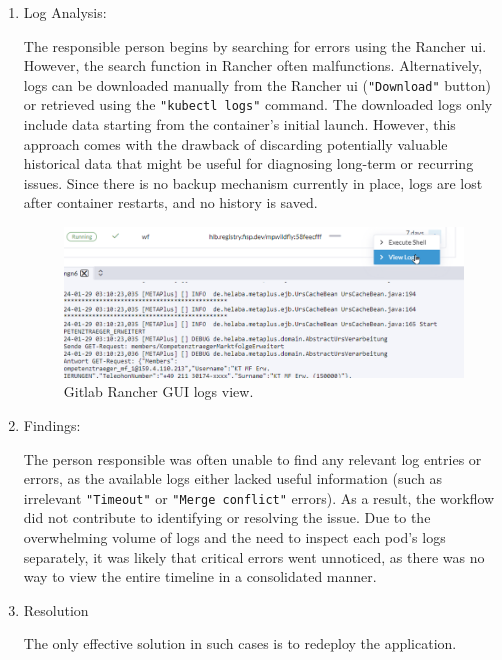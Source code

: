 \documentclass[../main.tex]{subfiles}
\begin{document}
\begin{enumerate}
    \item Log Analysis: 
    
    The responsible person begins by searching for errors using the Rancher \gls{ui}. However, the search function in Rancher often malfunctions. Alternatively, logs can be downloaded manually from the Rancher \gls{ui} (\texttt{"Download"} button) or retrieved using the \texttt{"kubectl logs"} command. The downloaded logs only include data starting from the container’s initial launch. However, this approach comes with the drawback of discarding potentially valuable historical data that might be useful for diagnosing long-term or recurring issues. Since there is no backup mechanism currently in place, logs are lost after container restarts, and no history is saved.

    \begin{figure}[H]
        \centering
        \includegraphics[scale=0.8]{img/3-background/gitlab/rancher_logs_gui.png}
        \caption{Gitlab Rancher GUI logs view.}
        \label{fig:rancher_logs_gui}
    \end{figure}

    \item Findings: 
    
    The person responsible was often unable to find any relevant log entries or errors, as the available logs either lacked useful information (such as irrelevant \texttt{"Timeout"} or \texttt{"Merge conflict"} errors). As a result, the workflow did not contribute to identifying or resolving the issue. Due to the overwhelming volume of logs and the need to inspect each pod’s logs separately, it was likely that critical errors went unnoticed, as there was no way to view the entire timeline in a consolidated manner.

    \item Resolution
    
    The only effective solution in such cases is to redeploy the application.
    
\end{enumerate}
\end{document}
